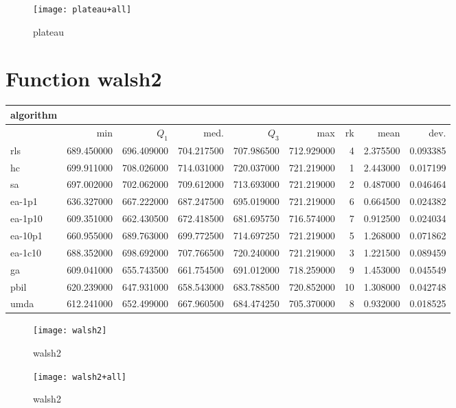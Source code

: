 \begin{center}
\begin{figure}[h]
\centering
\texttt{[image: plateau+all]}
\caption{plateau}
\end{figure}
\end{center}

\newpage

\section{Function walsh2}
\begin{center}
\begin{tabular}{@{}l*{5}{>{{}}N{3}{2}}>{{}}N{2}{0}N{1}{3}N{1}{3}@{}}
\toprule
{algorithm} &  &  \\
\midrule
& {min} & {$Q_1$} & {med.} & {$Q_3$} & {max} & {rk} & {mean} & {dev.} \\
\midrule
rls & 689.450000 & 696.409000 & 704.217500 & 707.986500 & 712.929000 & 4 & 2.375500 & 0.093385 \\
 hc & {\color{blue}} 699.911000 & {\color{blue}} 708.026000 & {\color{blue}} 714.031000 & 720.037000 & {\color{blue}} 721.219000 & 1 & 2.443000 & 0.017199 \\
 sa & 697.002000 & 702.062000 & 709.612000 & 713.693000 & {\color{blue}} 721.219000 & 2 & 0.487000 & 0.046464 \\
 ea-1p1 & 636.327000 & 667.222000 & 687.247500 & 695.019000 & {\color{blue}} 721.219000 & 6 & 0.664500 & 0.024382 \\
 ea-1p10 & 609.351000 & 662.430500 & 672.418500 & 681.695750 & 716.574000 & 7 & 0.912500 & 0.024034 \\
 ea-10p1 & 660.955000 & 689.763000 & 699.772500 & 714.697250 & {\color{blue}} 721.219000 & 5 & 1.268000 & 0.071862 \\
 ea-1c10 & 688.352000 & 698.692000 & 707.766500 & {\color{blue}} 720.240000 & {\color{blue}} 721.219000 & 3 & 1.221500 & 0.089459 \\
 ga & 609.041000 & 655.743500 & 661.754500 & 691.012000 & 718.259000 & 9 & 1.453000 & 0.045549 \\
 pbil & 620.239000 & 647.931000 & 658.543000 & 683.788500 & 720.852000 & 10 & 1.308000 & 0.042748 \\
 umda & 612.241000 & 652.499000 & 667.960500 & 684.474250 & 705.370000 & 8 & 0.932000 & 0.018525 \\
 \bottomrule
\end{tabular}
\end{center}

\begin{center}
\begin{figure}[h]
\centering
\texttt{[image: walsh2]}
\caption{walsh2}
\end{figure}
\end{center}

\begin{center}
\begin{figure}[h]
\centering
\texttt{[image: walsh2+all]}
\caption{walsh2}
\end{figure}
\end{center}

